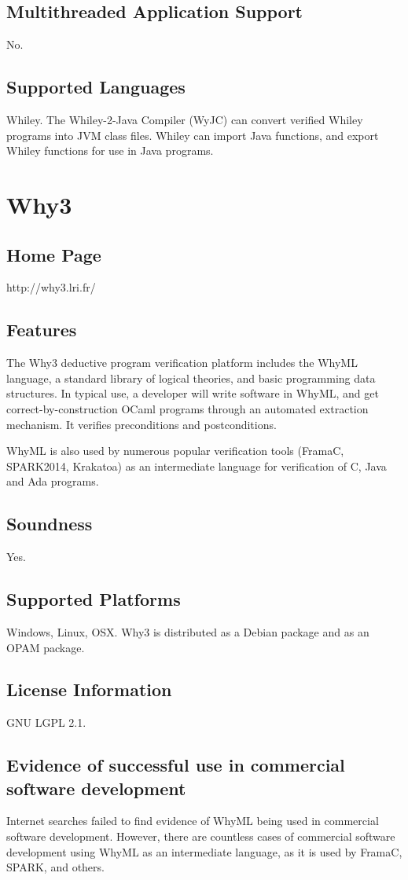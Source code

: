 \documentclass[12pt,openany,a4paper]{book}
\begin{document}
	\subsection{Multithreaded Application Support}
	No.
	\subsection{Supported Languages}
	Whiley. The Whiley-2-Java Compiler (WyJC) can convert verified Whiley programs into JVM class files. Whiley can import Java functions, and export Whiley functions for use in Java programs.






\section{Why3}
	\subsection{Home Page}
	http://why3.lri.fr/
	\subsection{Features}
	The Why3 deductive program verification platform includes the WhyML language, a standard library of logical theories, and basic programming data structures\cite{why3homepage}. In typical use, a developer will write software in WhyML, and get correct-by-construction OCaml programs through an automated extraction mechanism. It verifies preconditions and postconditions.
	
	WhyML is also used by numerous popular verification tools (FramaC, SPARK2014, Krakatoa) as an intermediate language for verification of C, Java and Ada programs.
	\subsection{Soundness}
	Yes.
	\subsection{Supported Platforms}
	Windows, Linux, OSX. Why3 is distributed as a Debian package and as an OPAM package.
	
	\subsection{License Information}
	GNU LGPL 2.1.
	\subsection{Evidence of successful use in commercial software development}
		Internet searches failed to find evidence of WhyML being used in commercial software development. However, there are countless cases of commercial software development using WhyML as an intermediate language, as it is used by FramaC, SPARK, and others.
 
\end{document}
